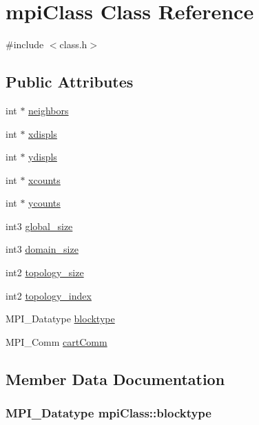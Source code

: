 \hypertarget{classmpi_class}{}\section{mpi\+Class Class Reference}
\label{classmpi_class}


{\ttfamily \#include $<$class.\+h$>$}

\subsection*{Public Attributes}
\begin{DoxyCompactItemize}
\item 
int $\ast$ \hyperlink{classmpi_class_ad0019edf1a5359e8aaec44562ebddc4b}{neighbors}
\item 
int $\ast$ \hyperlink{classmpi_class_ae3364097a0ec377e155e16b5175519fe}{xdispls}
\item 
int $\ast$ \hyperlink{classmpi_class_a5b07584bbf4b7795ecf5fb611056f906}{ydispls}
\item 
int $\ast$ \hyperlink{classmpi_class_a697f2c2435b42de0be6342b87deafde9}{xcounts}
\item 
int $\ast$ \hyperlink{classmpi_class_aae0968eba60a3b233d7fb9a7f2d4c9a9}{ycounts}
\item 
int3 \hyperlink{classmpi_class_af72cbafa23404f234d98ef45ea7de102}{global\+\_\+size}
\item 
int3 \hyperlink{classmpi_class_a87dbb559cd5f52da237b25a6d337018f}{domain\+\_\+size}
\item 
int2 \hyperlink{classmpi_class_a106d0552c37952ab3a1c9ea7a1c7e8d5}{topology\+\_\+size}
\item 
int2 \hyperlink{classmpi_class_a6bdbf711d0c196549ed141e122ac785e}{topology\+\_\+index}
\item 
M\+P\+I\+\_\+\+Datatype \hyperlink{classmpi_class_aaa2572662901d1cd4d1de325c7a29575}{blocktype}
\item 
M\+P\+I\+\_\+\+Comm \hyperlink{classmpi_class_ad69a5473dbdda4f7ace1100cdafd87d4}{cart\+Comm}
\end{DoxyCompactItemize}


\subsection{Member Data Documentation}
\subsubsection[{\texorpdfstring{blocktype}{blocktype}}]{\setlength{\rightskip}{0pt plus 5cm}M\+P\+I\+\_\+\+Datatype mpi\+Class\+::blocktype}\hypertarget{classmpi_class_aaa2572662901d1cd4d1de325c7a29575}{}\label{classmpi_class_aaa2572662901d1cd4d1de325c7a29575}
